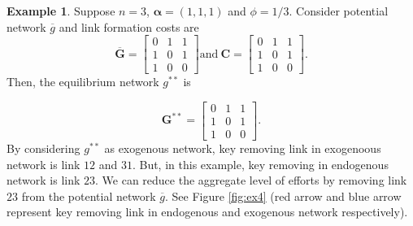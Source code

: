 \documentclass[12pt]{article}
\theoremstyle{definition}
\newtheorem{example}{Example}
\newcommand{\bm}[1]{\boldsymbol{#1}}
\begin{document}
\begin{example}
Suppose $n=3$, $\bm{\alpha} = (1,1,1)$ and $\phi = 1/3$.
Consider potential network $\overline{g}$ and link formation costs are
\[
\bm{\overline{G}} = \left[
            \begin{array}{ccc}
                0 & 1 & 1 \\
                1 & 0 & 1 \\
                1 & 0 & 0
            \end{array} \right]
\text{and} \ 
\bm{C} = \left[
            \begin{array}{ccc}
                0 & 1 & 1 \\
                1 & 0 & 1 \\
                1 & 0 & 0
            \end{array} \right].\]
Then, the equilibrium network $g^{**}$ is

\[ \bm{G}^{**} = \left[
    \begin{array}{ccc}
        0 & 1 & 1 \\
        1 & 0 & 1 \\
        1 & 0 & 0
    \end{array} \right]. \]
By considering $g^{**}$ as exogenous network, key removing link in exogenoous network is link $12$ and $31$.
But, in this example, key removing in endogenous network is link $23$.
We can reduce the aggregate level of efforts by removing link $23$ from the potential network $\overline{g}$.
See Figure \ref{fig:ex4} (red arrow and blue arrow represent key removing link in endogenous and exogenous network respectively).
\end{example}
\end{document}

